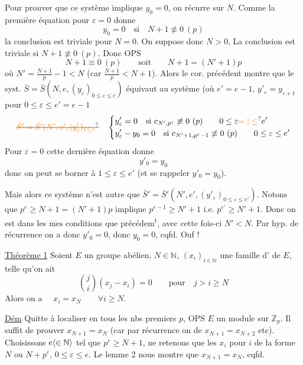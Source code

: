 Pour prouver que ce système implique $y_0=0$, on récurre sur $N$. Comme la première équation pour $\varepsilon=0$ donne
\[
y_0=0\quad\text{si}\quad N+1\not\equiv0\ (p)
\]
la conclusion est triviale pour $N=0$.  On suppose donc $N>0$,  La conclusion est triviale si $N+1\not\equiv0\ (p)$. Donc OPS
\[
N+1\equiv0\ (p)\qquad\text{soit}\qquad N+1=(N'+1)p
\]
où $N'=\frac{N+1}{p}-1<N$ (car $\frac{N+1}{p}<N+1$). Alors le cor. précédent montre que le syst. $\bar S=\bar S(N,e,(y_\varepsilon)_{0\leq\varepsilon\leq e})$  équivaut au système (où $e'=e-1$, $y'_\varepsilon=y_{\varepsilon+1}$ pour $0\leq\varepsilon\leq e'=e-1$
\[
\deleted{\unsure{\bar S'=\bar S'(N',e',(y'_\varepsilon)_{1\leq\varepsilon}}}\quad
\left\{\begin{aligned}
&y'_\varepsilon=0\quad\text{si }c_{N',p^\varepsilon}\not\equiv0\ (p)\qquad 0\leq\varepsilon\unsure{=|\leq}e'\\
&y'_\varepsilon-y_0=0\quad\text{si }c_{N'+1,p^\varepsilon-1}\not\equiv0\ (p)\qquad 0\leq\varepsilon\leq e'
\end{aligned}\right.
\]
Pour $\varepsilon=0$ cette dernière équation donne 
\[
y'_0=y_0
\]
donc on peut se borner à $1\leq\varepsilon\leq e'$ (et se rappeler $y'_0=y_0$).

Mais alors ce système n'est autre que $\bar S'=\bar S'(N',e',(y'_\varepsilon)_{0\leq\varepsilon\leq e'})$. Notons que $p^e\geq N+1=(N'+1)p$ implique $p^{e-1}\geq N'+1$ i.e. $p^{e'}\geq N'+1$. Donc on est dans les $\overline{\mathrm{mes}}$ conditions que précédem\textsuperscript{t}, avec cette fois-ci $N'<N$. Par hyp. de récurrence on a donc $y'_0=0$, donc $y_0=0$, cqfd. Ouf !

\uline{Théorème 1} Soient $E$ un groupe abélien, $N\in\mathbb{N}$, $(x_i)_{i\in\mathbb{N}}$ une famille d' de $E$, telle qu'on ait
\[
\binom{j}{i}(x_j-x_i)=0\qquad\text{pour}\quad j>i\geq N
\]
Alors on a $\quad x_i=x_N\qquad\forall i\geq N$.

\uline{Dém} Quitte à localiser en tous les nbs premiers $p$, OPS $E$ un module sur  $\mathbb{Z}_p$. Il suffit de prouver $x_{N+1}=x_N$ (car par récurrence on  de  $x_{N+1}=x_{N+2}$ etc). Choisissons $e\inserted{\in\mathbb{N}}$ tel que $p^e\geq N+1$, ne retenons que les $x_i$ pour $i$ de la forme $N$ ou $N+p^\varepsilon$, $0\leq\varepsilon\leq e$. Le lemme 2 nous montre que $x_{N+1}=x_N$, cqfd.

